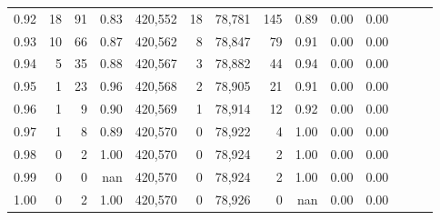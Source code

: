 \begin{tabular}{rrrrrrrrrrrrrr}
0.92 &     18 &     91 &  0.83 &  420,552 &       18 &  78,781 &     145 &  0.89 &  0.00 &      0.00 \\
0.93 &     10 &     66 &  0.87 &  420,562 &        8 &  78,847 &      79 &  0.91 &  0.00 &      0.00 \\
0.94 &      5 &     35 &  0.88 &  420,567 &        3 &  78,882 &      44 &  0.94 &  0.00 &      0.00 \\
0.95 &      1 &     23 &  0.96 &  420,568 &        2 &  78,905 &      21 &  0.91 &  0.00 &      0.00 \\
0.96 &      1 &      9 &  0.90 &  420,569 &        1 &  78,914 &      12 &  0.92 &  0.00 &      0.00 \\
0.97 &      1 &      8 &  0.89 &  420,570 &        0 &  78,922 &       4 &  1.00 &  0.00 &      0.00 \\
0.98 &      0 &      2 &  1.00 &  420,570 &        0 &  78,924 &       2 &  1.00 &  0.00 &      0.00 \\
0.99 &      0 &      0 &   nan &  420,570 &        0 &  78,924 &       2 &  1.00 &  0.00 &      0.00 \\
1.00 &      0 &      2 &  1.00 &  420,570 &        0 &  78,926 &       0 &   nan &  0.00 &      0.00 \\
\bottomrule
\end{tabular}

